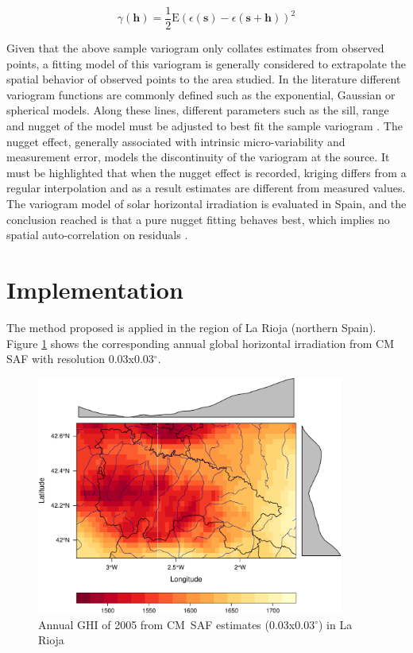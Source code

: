 \documentclass[11pt, english]{article}
\let\cite\citep
\begin{document}
\begin{equation}
\label{eq:variogram}
\gamma(\mathbf{h}) = \frac{1}{2} \textrm{E}(\epsilon(\mathbf{s}) -
\epsilon(\mathbf{s} + \mathbf{h}))^2
\end{equation}

Given that the above sample variogram only collates estimates from
observed points, a fitting model of this variogram is generally
considered to extrapolate the spatial behavior of observed points to
the area studied. In the literature different variogram functions are
commonly defined such as the exponential, Gaussian or spherical
models. Along these lines, different parameters such as the sill,
range and nugget of the model must be adjusted to best fit the sample
variogram \cite{Hengl2009}. The nugget effect, generally associated
with intrinsic micro-variability and measurement error, models the
discontinuity of the variogram at the source. It must be highlighted
that when the nugget effect is recorded, kriging differs from a
regular interpolation and as a result estimates are different from
measured values. The variogram model of solar horizontal irradiation
is evaluated in Spain, and the conclusion reached is that a pure
nugget fitting behaves best, which implies no spatial auto-correlation
on residuals \cite{Antonanzas-Torres.Canizares.ea2013}.

\section{Implementation}
\label{sec-1}

The method proposed is applied in the region of La Rioja (northern
Spain). Figure \ref{fig:cmsaf} shows the corresponding annual global
horizontal irradiation from CM SAF with resolution 0.03x0.03$^\circ$.

\begin{figure}[H]
  \centering
  \includegraphics[width=0.9\textwidth]{GHI2005aCMSAF003x003.pdf}
  \caption{Annual GHI of 2005 from CM~SAF estimates (0.03x0.03$^\circ$) in La Rioja}
  \label{fig:cmsaf}
\end{figure}
\end{document}
